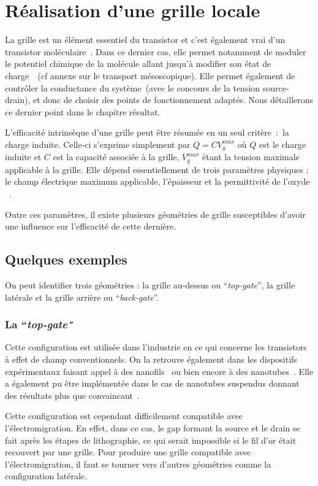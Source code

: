 \section{Réalisation d'une grille locale}
La grille est un élément essentiel du transistor et c'est également vrai d'un transistor moléculaire~\cite{Datta2009,Zant2006}. Dans ce dernier cas, elle permet notamment de moduler le potentiel chimique de la molécule allant jusqu'à modifier son état de charge~\cite{Beenakker1991,Wiel2002,Hanson2007}~(cf annexe sur le transport mésoscopique). Elle permet également de contrôler la conductance du système~(avec le concours de la tension source-drain), et donc de choisir des points de fonctionnement adaptés. Nous détaillerons ce dernier point dans le chapitre résultat. 

L'efficacité intrinsèque d'une grille peut être résumée en un seul critère~:~la charge induite. Celle-ci s'exprime simplement par $Q = CV_g^{max}$ où $Q$ est le charge induite et $C$ est la capacité associée à la grille, $V_g^{max}$ étant la tension maximale applicable à la grille. Elle dépend essentiellement de trois paramètres physiques : le champ électrique maximum applicable, l'épaisseur et la permittivité de l'oxyde ~\cite{Biercuk2003}. 

Outre ces paramètres, il existe plusieurs géométries de grille susceptibles d'avoir une influence sur l’efficacité de cette dernière.

\subsection{Quelques exemples}
On peut identifier trois géométries : la grille au-dessus ou  ``\textit{top-gate}'', la grille latérale et la grille arrière ou  ``\textit{back-gate}''.

\subsubsection{La ``\textit{top-gate"}}
Cette configuration est utilisée dans l'industrie en ce qui concerne les transistors à effet de champ conventionnels. On la retrouve également dans les dispositifs expérimentaux faisant appel à des nanofils~\cite{Fasth2005} ou bien encore à des nanotubes~\cite{Javey2002}. Elle a également pu être implémentée dans le cas de nanotubes suspendus donnant des résultats plus que convaincant~\cite{Leturcq2009}.

Cette configuration est cependant difficilement compatible avec l'électromigration. En effet, dans ce cas, le gap formant la source et le drain se fait après les étapes de lithographie, ce qui serait impossible si le fil d'or était recouvert par une grille. Pour produire une grille compatible avec l'électromigration, il faut se tourner vers d'autres géométries comme la configuration latérale.

